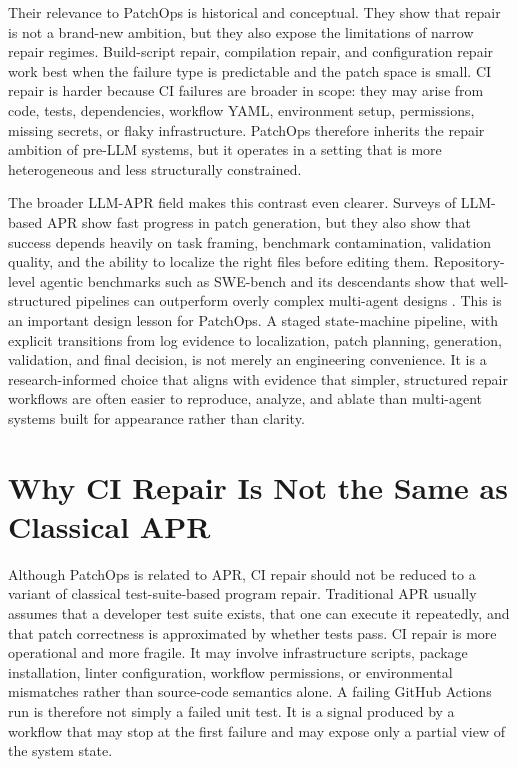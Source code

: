 Their relevance to PatchOps is historical and conceptual. They show that repair is not a brand-new ambition,
but they also expose the limitations of narrow repair regimes. Build-script repair, compilation repair, and
configuration repair work best when the failure type is predictable and the patch space is small. CI repair is
harder because CI failures are broader in scope: they may arise from code, tests, dependencies, workflow YAML,
environment setup, permissions, missing secrets, or flaky infrastructure. PatchOps therefore inherits the
repair ambition of pre-LLM systems, but it operates in a setting that is more heterogeneous and less
structurally constrained.

The broader LLM-APR field makes this contrast even clearer. Surveys of LLM-based APR show fast progress in
patch generation, but they also show that success depends heavily on task framing, benchmark contamination,
validation quality, and the ability to localize the right files before editing them. Repository-level agentic
benchmarks such as SWE-bench and its descendants show that well-structured pipelines can outperform overly
complex multi-agent designs \cite{llmaprsurvey2025,llmaprslr2024,swebench2023,agentless2025}. This is an important design lesson for PatchOps. A staged state-machine pipeline,
with explicit transitions from log evidence to localization, patch planning, generation, validation, and final
decision, is not merely an engineering convenience. It is a research-informed choice that aligns with evidence
that simpler, structured repair workflows are often easier to reproduce, analyze, and ablate than multi-agent
systems built for appearance rather than clarity.

\section{Why CI Repair Is Not the Same as Classical APR}

Although PatchOps is related to APR, CI repair should not be reduced to a variant of classical test-suite-based
program repair. Traditional APR usually assumes that a developer test suite exists, that one can execute it
repeatedly, and that patch correctness is approximated by whether tests pass. CI repair is more operational and
more fragile. It may involve infrastructure scripts, package installation, linter configuration, workflow
permissions, or environmental mismatches rather than source-code semantics alone. A failing GitHub Actions run
is therefore not simply a failed unit test. It is a signal produced by a workflow that may stop at the first
failure and may expose only a partial view of the system state.

